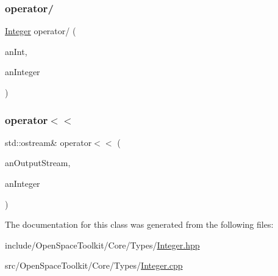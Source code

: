 \subsubsection{\texorpdfstring{operator/}{operator/}}
{\footnotesize\ttfamily \hyperlink{classostk_1_1core_1_1types_1_1_integer}{Integer} operator/ (\begin{DoxyParamCaption}\item[{const \hyperlink{classostk_1_1core_1_1types_1_1_integer_a76a5f41f78659f116eafaf26cecc3244}{Integer\+::\+Value\+Type} \&}]{an\+Int,  }\item[{const \hyperlink{classostk_1_1core_1_1types_1_1_integer}{Integer} \&}]{an\+Integer }\end{DoxyParamCaption})\hspace{0.3cm}{\ttfamily [friend]}}

\mbox{\label{classostk_1_1core_1_1types_1_1_integer_aec29fc1731201932ab34cfe2ec83fbc9}} 
\subsubsection{\texorpdfstring{operator$<$$<$}{operator<<}}
{\footnotesize\ttfamily std\+::ostream\& operator$<$$<$ (\begin{DoxyParamCaption}\item[{std\+::ostream \&}]{an\+Output\+Stream,  }\item[{const \hyperlink{classostk_1_1core_1_1types_1_1_integer}{Integer} \&}]{an\+Integer }\end{DoxyParamCaption})\hspace{0.3cm}{\ttfamily [friend]}}



The documentation for this class was generated from the following files\+:\begin{DoxyCompactItemize}
\item 
include/\+Open\+Space\+Toolkit/\+Core/\+Types/\hyperlink{_integer_8hpp}{Integer.\+hpp}\item 
src/\+Open\+Space\+Toolkit/\+Core/\+Types/\hyperlink{_integer_8cpp}{Integer.\+cpp}\end{DoxyCompactItemize}
